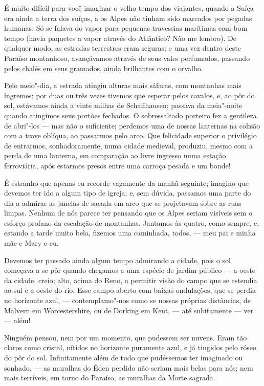 É muito difícil para você imaginar o velho tempo dos viajantes,
quando a Suíça era ainda a terra dos suíços, a os Alpes não tinham sido
marcados por pegadas humanas. Só se falava do vapor para pequenas
travessias marítimas com bom tempo (havia paquetes a vapor através do
Atlântico? Não me lembro). De qualquer modo, as estradas terrestres eram
seguras; e uma vez dentro deste Paraíso montanhoso, avançávamos através
de seus vales perfumados, passando pelos chalés em seus gramados, ainda
brilhantes com o orvalho.

Pelo meio"-dia, a estrada atingiu alturas mais sáfaras, com montanhas
mais íngremes; por duas ou três vezes tivemos que esperar pelos cavalos,
e, ao pôr do sol, estávamos ainda a vinte milhas de Schaffhausen;
passava da meia"-noite quando atingimos seus portões fechados. O
sobressaltado porteiro fez a gentileza de abri"-los --- mas não o
suficiente; perdemos uma de nossas lanternas na colisão com a trave
oblíqua, ao passarmos pelo arco. Que felicidade superior o privilégio de
entrarmos, sonhadoramente, numa cidade medieval, produziu, mesmo com a
perda de uma lanterna, em comparação ao livre ingresso numa estação
ferroviária, após estarmos presos entre uma carroça pesada e um bonde!

É estranho que apenas eu recorde vagamente da manhã seguinte;
imagino que devemos ter ido a algum tipo de igreja; e, sem dúvida,
passamos uma parte do dia a admirar as janelas de sacada em arco que se
projetavam sobre as ruas limpas. Nenhum de nós parece ter pensando que
os Alpes seriam visíveis sem o esforço profano da escalação de
montanhas. Jantamos às quatro, como sempre, e, estando a tarde muito
bela, fizemos uma caminhada, todos, --- meu pai e minha mãe e Mary e eu.

Devemos ter passado ainda algum tempo admirando a cidade, pois o sol
começava a se pôr quando chegamos a uma espécie de jardim público --- a
oeste da cidade, creio; alto, acima do Reno, a permitir visão do campo
que se estendia ao sul e a oeste do rio. Esse campo aberto com baixas
ondulações, que se perdia no horizonte azul, --- contemplamo"-nos como se
nossas próprias distâncias, de Malvern em Worcestershire, ou de Dorking
em Kent, --- até subitamente --- ver --- além!

Ninguém pensou, nem por um momento, que pudessem ser nuvens. Eram
tão claros como cristal, nítidos no horizonte puramente azul, e já
tingidos pelo róseo do pôr do sol. Infinitamente além de tudo que
pudéssemos ter imaginado ou sonhado, --- as muralhas do Éden perdido não
seriam mais belas para nós; nem mais terríveis, em torno do Paraíso, as
muralhas da Morte sagrada.

